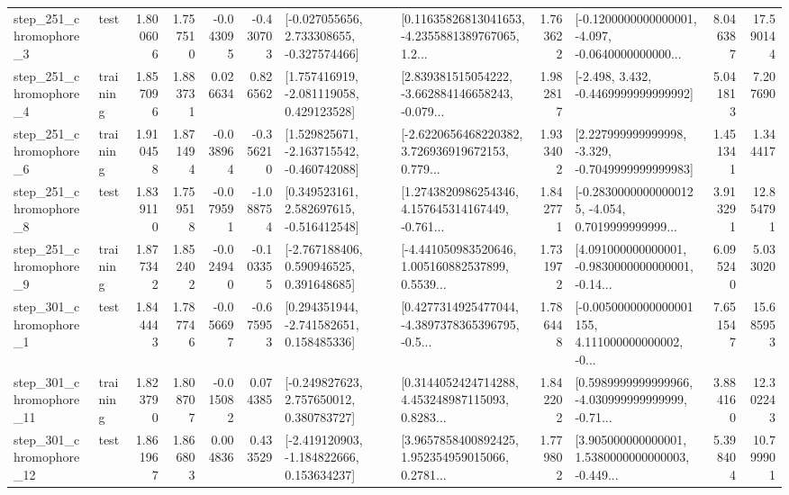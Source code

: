 \begin{tabular}{llrrrrllrlrr}
   step\_251\_chromophore\_3 &      test &      1.800606 &    1.757510 &     -0.043095 & -0.430703 &   [-0.027055656, 2.733308655, -0.327574466] &  [0.11635826813041653, -4.2355881389767065, 1.2... &       1.763622 &  [-0.1200000000000001, -4.097, -0.0640000000000... &            8.046387 &         17.590144 \\
   step\_251\_chromophore\_4 &  training &      1.857096 &    1.883731 &      0.026634 &  0.826562 &    [1.757416919, -2.081119058, 0.429123528] &  [2.839381515054222, -3.662884146658243, -0.079... &       1.982817 &               [-2.498, 3.432, -0.4469999999999992] &            5.041813 &          7.207690 \\
   step\_251\_chromophore\_6 &  training &      1.910458 &    1.871494 &     -0.038964 & -0.356210 &   [1.529825671, -2.163715542, -0.460742088] &  [-2.6220656468220382, 3.726936919672153, 0.779... &       1.933402 &   [2.227999999999998, -3.329, -0.7049999999999983] &            1.451341 &          1.344417 \\
   step\_251\_chromophore\_8 &      test &      1.839110 &    1.759518 &     -0.079591 & -1.088754 &    [0.349523161, 2.582697615, -0.516412548] &  [1.2743820986254346, 4.157645314167449, -0.761... &       1.842771 &  [-0.28300000000000125, -4.054, 0.7019999999999... &            3.913291 &         12.854791 \\
   step\_251\_chromophore\_9 &  training &      1.877342 &    1.852402 &     -0.024940 & -0.103355 &    [-2.767188406, 0.590946525, 0.391648685] &  [-4.441050983520646, 1.005160882537899, 0.5539... &       1.731972 &  [4.091000000000001, -0.9830000000000001, -0.14... &            6.095240 &          5.033020 \\
   step\_301\_chromophore\_1 &      test &      1.844443 &    1.787746 &     -0.056697 & -0.675953 &    [0.294351944, -2.741582651, 0.158485336] &  [0.4277314925477044, -4.3897378365396795, -0.5... &       1.786448 &  [-0.0050000000000001155, 4.111000000000002, -0... &            7.651547 &         15.685953 \\
  step\_301\_chromophore\_11 &  training &      1.823790 &    1.808707 &     -0.015082 &  0.074385 &    [-0.249827623, 2.757650012, 0.380783727] &  [0.3144052424714288, 4.453248987115093, 0.8283... &       1.842202 &  [0.5989999999999966, -4.030999999999999, -0.71... &            3.884160 &         12.302243 \\
  step\_301\_chromophore\_12 &      test &      1.861967 &    1.866803 &      0.004836 &  0.433529 &   [-2.419120903, -1.184822666, 0.153634237] &  [3.9657858400892425, 1.952354959015066, 0.2781... &       1.779802 &  [3.905000000000001, 1.5380000000000003, -0.449... &            5.398404 &         10.799901 \\

\end{tabular}
